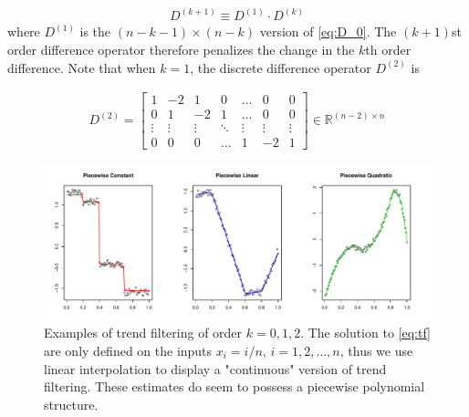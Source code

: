 \documentclass[a4paper]{article}
\newcommand{\RR}{\mathbb{R}}
\begin{document}
\begin{align}
D^{(k+1)} \equiv D^{(1)} \cdot D^{(k)} 
\label{eq:difference_op}
\end{align}
where $D^{(1)}$ is the $(n-k-1)\times (n-k)$ version of \eqref{eq:D_0}. The $(k+1)$st order difference operator therefore penalizes the change in the $k$th order difference. Note that when $k = 1$, the discrete difference operator $D^{(2)}$ is


\begin{align}
D^{(2)} =
\begin{bmatrix}
1 & -2 & 1 & 0 & \ldots & 0 & 0\\
0 & 1 & -2 & 1 & \ldots & 0 & 0\\
\vdots & \vdots & \vdots & \ddots & \vdots & \vdots & \vdots\\
0 & 0 & 0 & \ldots & 1 & -2 & 1
\end{bmatrix}\in\RR^{(n-2) \times n}
\end{align}

\begin{figure}[t!]
\centering
\includegraphics[width = 1\textwidth]{Figures/Figure1.pdf}
\caption{Examples of trend filtering of order $k =0, 1, 2$. The solution to \eqref{eq:tf} are only defined on the inputs $x_i = i/n$, $i=1,2,\ldots, n$, thus we use linear interpolation to display a "continuous" version of trend filtering. These estimates do seem to possess a piecewise polynomial structure.}
\label{fig:Figure1_examples}
\end{figure}
\end{document}
